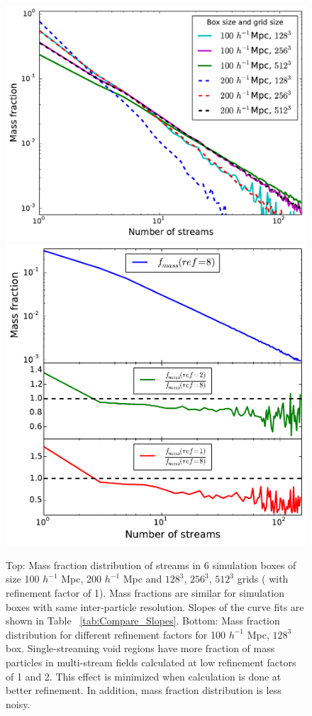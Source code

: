 \begin{figure}
\begin{minipage}[t]{.99\linewidth}

  \centering\includegraphics[width=10.cm]{Chapter3/Source_v2/fig4a} 
  \centering\includegraphics[width=10.cm]{Chapter3/Source_v2/fig4b}
\end{minipage}\hfill
\caption{Top: Mass fraction distribution of streams in 6 simulation boxes of size 100 $h^{-1}$ Mpc, 200 $h^{-1}$ Mpc 
and $128^{3}$, $256^{3}$, $512^{3}$ grids ( with refinement factor of 1). Mass fractions are similar for simulation boxes with same inter-particle resolution. Slopes of the curve fits are shown in Table ~\ref{tab:Compare_Slopes}. Bottom: Mass fraction distribution for different refinement factors for 100 $h^{-1}$ Mpc, $128^{3}$ box. Single-streaming void regions have more fraction of mass particles in multi-stream fields calculated at low refinement factors of 1 and 2. This effect is minimized when calculation is done at better refinement. In addition, mass fraction distribution is less noisy.}
\label{fig:Mfr_all}
\end{figure}

